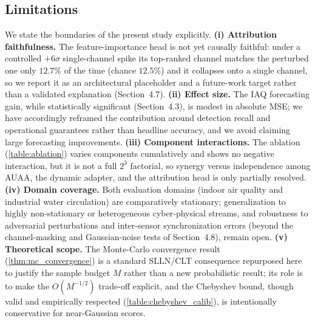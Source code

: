 \subsection{Limitations}

We state the boundaries of the present study explicitly. \textbf{(i) Attribution faithfulness.} The feature-importance head is not yet causally faithful: under a controlled $+6\sigma$ single-channel spike its top-ranked channel matches the perturbed one only $12.7\%$ of the time (chance $12.5\%$) and it collapses onto a single channel, so we report it as an architectural placeholder and a future-work target rather than a validated explanation (Section~4.7). \textbf{(ii) Effect size.} The IAQ forecasting gain, while statistically significant (Section~4.3), is modest in absolute MSE; we have accordingly reframed the contribution around detection recall and operational guarantees rather than headline accuracy, and we avoid claiming large forecasting improvements. \textbf{(iii) Component interactions.} The ablation (\cref{table:ablation}) varies components cumulatively and shows no negative interaction, but it is not a full $2^3$ factorial, so synergy versus independence among AUAA, the dynamic adapter, and the attribution head is only partially resolved. \textbf{(iv) Domain coverage.} Both evaluation domains (indoor air quality and industrial water circulation) are comparatively stationary; generalization to highly non-stationary or heterogeneous cyber-physical streams, and robustness to adversarial perturbations and inter-sensor synchronization errors (beyond the channel-masking and Gaussian-noise tests of Section~4.8), remain open. \textbf{(v) Theoretical scope.} The Monte-Carlo convergence result (\cref{thm:mc_convergence}) is a standard SLLN/CLT consequence repurposed here to justify the sample budget $M$ rather than a new probabilistic result; its role is to make the $O(M^{-1/2})$ trade-off explicit, and the Chebyshev bound, though valid and empirically respected (\cref{table:chebyshev_calib}), is intentionally conservative for near-Gaussian scores.